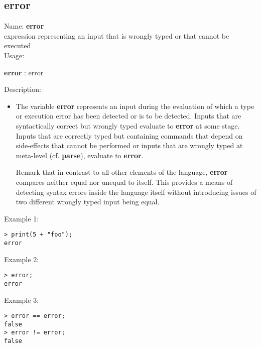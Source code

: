 \subsection{error}
\label{laberror}
\noindent Name: \textbf{error}\\
expression representing an input that is wrongly typed or that cannot be executed\\
\noindent Usage: 
\begin{center}
\textbf{error} : \textsf{error}
\\ 
\end{center}
\noindent Description: \begin{itemize}

\item The variable \textbf{error} represents an input during the evaluation of
   which a type or execution error has been detected or is to be
   detected. Inputs that are syntactically correct but wrongly typed
   evaluate to \textbf{error} at some stage.  Inputs that are correctly typed
   but containing commands that depend on side-effects that cannot be
   performed or inputs that are wrongly typed at meta-level (cf. \textbf{parse}),
   evaluate to \textbf{error}.
    
   Remark that in contrast to all other elements of the \sollya language,
   \textbf{error} compares neither equal nor unequal to itself. This provides a
   means of detecting syntax errors inside the \sollya language itself
   without introducing issues of two different wrongly typed input being
   equal.
\end{itemize}
\noindent Example 1: 
\begin{center}\begin{minipage}{15cm}\begin{Verbatim}[frame=single]
> print(5 + "foo");
error
\end{Verbatim}
\end{minipage}\end{center}
\noindent Example 2: 
\begin{center}\begin{minipage}{15cm}\begin{Verbatim}[frame=single]
> error;
error
\end{Verbatim}
\end{minipage}\end{center}
\noindent Example 3: 
\begin{center}\begin{minipage}{15cm}\begin{Verbatim}[frame=single]
> error == error;
false
> error != error;
false
\end{Verbatim}
\end{minipage}\end{center}
